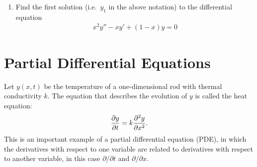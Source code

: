 \documentclass{book}
\begin{document}
\begin{enumerate}
  \item Find the first solution (i.e.\ $y_1$ in the above notation) to the
    differential equation
    \begin{align*}
    x^2 y'' - xy' + (1-x)y=0
    \end{align*}

\end{enumerate}



\chapter{Partial Differential Equations}
Let $y(x,t)$ be the temperature of a one-dimensional rod with thermal
conductivity $k$. The equation that describes the evolution of $y$ is
called the heat equation:
\begin{align*}
\frac{\partial y}{\partial t} =  k\frac{\partial^2 y}{\partial x^2}.
\end{align*}
This is an important example of a partial differential equation (PDE), in which
the derivatives with respect to one variable are related to derivatives with
respect to another variable, in this case $\partial/\partial t$ and
$\partial/\partial x$.
\end{document}

